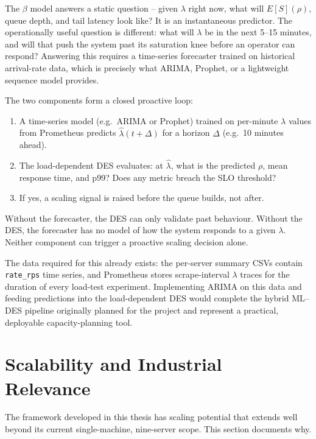 The $\beta$ model answers a static question -- given $\lambda$ right now, what will $E[S](\rho)$, queue depth, and tail latency look like? It is an instantaneous predictor. The operationally useful question is different: what will $\lambda$ be in the next 5--15 minutes, and will that push the system past its saturation knee before an operator can respond? Answering this requires a time-series forecaster trained on historical arrival-rate data, which is precisely what ARIMA, Prophet, or a lightweight sequence model provides.

The two components form a closed proactive loop:
\begin{enumerate}
    \item A time-series model (e.g.\ ARIMA or Prophet) trained on per-minute $\lambda$ values from Prometheus predicts $\hat{\lambda}(t + \Delta)$ for a horizon $\Delta$ (e.g.\ 10 minutes ahead).
    \item The load-dependent DES evaluates: at $\hat{\lambda}$, what is the predicted $\rho$, mean response time, and p99? Does any metric breach the SLO threshold?
    \item If yes, a scaling signal is raised before the queue builds, not after.
\end{enumerate}

Without the forecaster, the DES can only validate past behaviour. Without the DES, the forecaster has no model of how the system responds to a given $\lambda$. Neither component can trigger a proactive scaling decision alone.

The data required for this already exists: the per-server summary CSVs contain \texttt{rate\_rps} time series, and Prometheus stores scrape-interval $\lambda$ traces for the duration of every load-test experiment. Implementing ARIMA on this data and feeding predictions into the load-dependent DES would complete the hybrid ML--DES pipeline originally planned for the project and represent a practical, deployable capacity-planning tool.

\section{Scalability and Industrial Relevance}
\label{sec:scalability}

The framework developed in this thesis has scaling potential that extends well beyond its current single-machine, nine-server scope. This section documents why.

